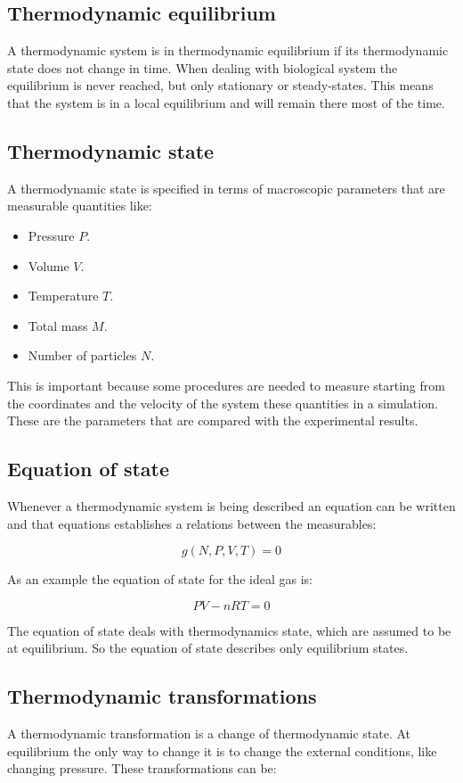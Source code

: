 	\subsection{Thermodynamic equilibrium}
	A thermodynamic system is in thermodynamic equilibrium if its thermodynamic state does not change in time.
	When dealing with biological system the equilibrium is never reached, but only stationary or steady-states.
	This means that the system is in a local equilibrium and will remain there most of the time.

	\subsection{Thermodynamic state}
	A thermodynamic state is specified in terms of macroscopic parameters that are measurable quantities like:

	\begin{multicols}{2}
		\begin{itemize}
			\item Pressure $P$.
			\item Volume $V$.
			\item Temperature $T$.
			\item Total mass $M$.
			\item Number of particles $N$.
		\end{itemize}
	\end{multicols}

	This is important because some procedures are needed to measure starting from the coordinates and the velocity of the system these quantities in a simulation.
	These are the parameters that are compared with the experimental results.

	\subsection{Equation of state}
	Whenever a thermodynamic system is being described an equation can be written and that equations establishes a relations between the measurables:

	$$g(N, P, V, T) = 0$$

	As an example the equation of state for the ideal gas is:

	$$PV-nRT=0$$

	The equation of state deals with thermodynamics state, which are assumed to be at equilibrium.
	So the equation of state describes only equilibrium states.

	\subsection{Thermodynamic transformations}
	A thermodynamic transformation is a change of thermodynamic state.
	At equilibrium the only way to change it is to change the external conditions, like changing pressure.
	These transformations can be:

